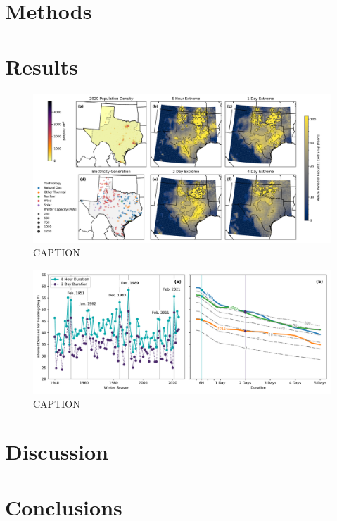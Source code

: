 \documentclass[12pt]{iopart}
\begin{document}
\section{Methods}

\section{Results}

\begin{figure}
  \centering
  \includegraphics[width=\textwidth]{local_rt_era5.pdf}
  \caption{CAPTION}\label{fig:local_era5}
\end{figure}

\begin{figure}
  \centering
  \includegraphics[width=\textwidth]{ERCOT_HDD_IDF_MLE_popweighted.pdf}
  \caption{CAPTION}\label{fig:idf_weighted}
\end{figure}

\section{Discussion}

\section{Conclusions}
\end{document}
